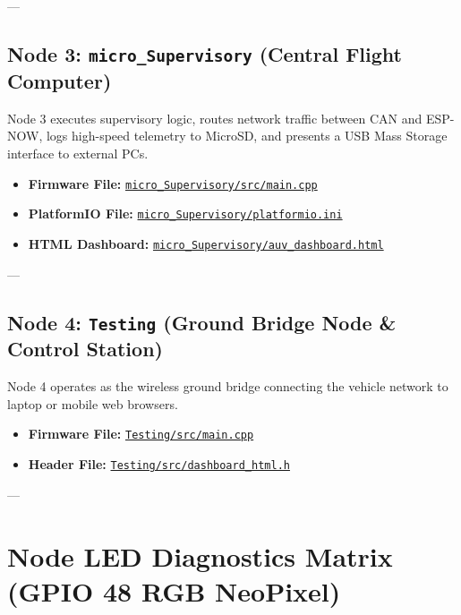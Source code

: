 \documentclass[11pt,a4paper]{article}
\begin{document}
---

\subsection{Node 3: \texttt{micro\_Supervisory} (Central Flight Computer)}
Node 3 executes supervisory logic, routes network traffic between CAN and ESP-NOW, logs high-speed telemetry to MicroSD, and presents a USB Mass Storage interface to external PCs.

\begin{itemize}
    \item \textbf{Firmware File:} \href{file:///c:/Users/MP2KC/OneDrive/Documents/PlatformIO/Projects/micro_Supervisory/src/main.cpp}{\texttt{micro\_Supervisory/src/main.cpp}}
    \item \textbf{PlatformIO File:} \href{file:///c:/Users/MP2KC/OneDrive/Documents/PlatformIO/Projects/micro_Supervisory/platformio.ini}{\texttt{micro\_Supervisory/platformio.ini}}
    \item \textbf{HTML Dashboard:} \href{file:///c:/Users/MP2KC/OneDrive/Documents/PlatformIO/Projects/micro_Supervisory/auv_dashboard.html}{\texttt{micro\_Supervisory/auv\_dashboard.html}}
\end{itemize}

---

\subsection{Node 4: \texttt{Testing} (Ground Bridge Node \& Control Station)}
Node 4 operates as the wireless ground bridge connecting the vehicle network to laptop or mobile web browsers.

\begin{itemize}
    \item \textbf{Firmware File:} \href{file:///c:/Users/MP2KC/OneDrive/Documents/PlatformIO/Projects/Testing/src/main.cpp}{\texttt{Testing/src/main.cpp}}
    \item \textbf{Header File:} \href{file:///c:/Users/MP2KC/OneDrive/Documents/PlatformIO/Projects/Testing/src/dashboard_html.h}{\texttt{Testing/src/dashboard\_html.h}}
\end{itemize}

---

\section{Node LED Diagnostics Matrix (GPIO 48 RGB NeoPixel)}
\end{document}
